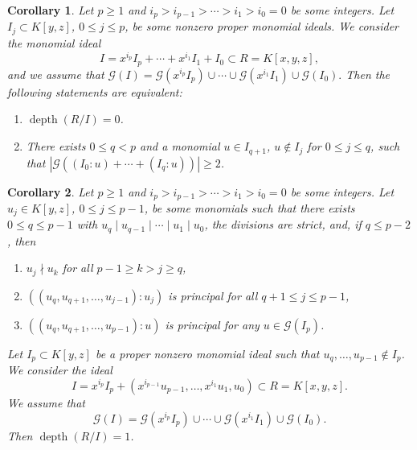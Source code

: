 \documentclass[10pt,a4paper]{amsart}
\newtheorem{corollary}{Corollary}
\def\depth{\operatorname{depth}}
\begin{document}
\begin{corollary}\label{c2}
Let $p\geq 1$ and $i_p>i_{p-1}>\cdots>i_1>i_0=0$ be some integers. Let $I_j\subset K[y,z]$, $0\leq j\leq p$, be some nonzero 
proper monomial ideals. We consider the monomial ideal $$I=x^{i_p}I_p + \cdots + x^{i_1}I_1 + I_0 \subset R=K[x,y,z],$$
 and we assume that
$\mathcal{G}(I)=\mathcal{G}(x^{i_p}I_p) \cup \cdots \cup \mathcal{G}(x^{i_1}I_1) \cup \mathcal{G}(I_0).$ 
Then the following statements are  equivalent:
\begin{enumerate}
\item[(1)] $\depth(R/I)=0$.
\item[(2)] There exists $0\leq q<p$ and a monomial $u\in I_{q+1}$, $u\notin I_j$  for $0\leq j\leq q$, 
           such that $|\mathcal{G}((I_0:u)+\cdots+(I_q:u))|\geq 2$.
\end{enumerate}
\end{corollary}

\begin{corollary} \label{C4}
Let $p\geq 1$ and $i_p>i_{p-1}>\cdots>i_1>i_0=0$ be some integers. Let $u_j\in K[y,z]$, $0\leq j\leq p-1$, be some monomials such that
there exists $0\leq q\leq p-1$ with $u_q\mid u_{q-1} \mid  \cdots \mid u_1 \mid u_0$, the divisions are strict, and,
if $q\leq p-2$, then
\begin{enumerate}
\item[(i)]   $u_j\nmid u_k$ for all $p-1\geq k>j\geq q$,
\item[(ii)]  $((u_{q},u_{q+1},\ldots,u_{j-1}):u_j)$ is principal  for all $q+1\leq j\leq p-1$,
\item[(iii)] $((u_{q},u_{q+1},\ldots, u_{p-1}):u)$ is principal  for any $u\in \mathcal G(I_p)$.
\end{enumerate}
Let $I_p\subset K[y,z]$ be a proper nonzero monomial ideal such that $u_q,\ldots,u_{p-1}\notin I_p$. We consider the ideal
$$I=x^{i_p}I_p+(x^{i_{p-1}}u_{p-1},\ldots,x^{i_1}u_1,u_0)\subset R=K[x,y,z].$$
We assume that \[
\mathcal{G}(I)
=
\mathcal{G}(x^{i_p}I_p)\cup\cdots\cup
\mathcal{G}(x^{i_1}I_1)\cup\mathcal{G}(I_0).
\]
Then $\depth(R/I)=1$.
\end{corollary}
\end{document}
